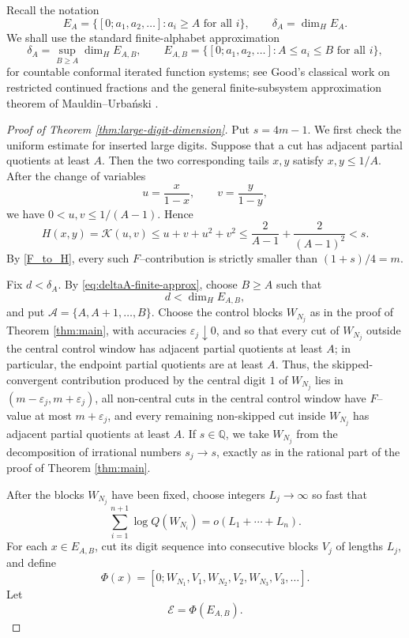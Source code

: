 \documentclass[11pt]{amsart}
\newcommand{\Q}{\mathbb Q}
\newcommand{\Kfun}{\mathcal K}
\begin{document}
Recall the notation
$$
        E_A=\{[0;a_1,a_2,\ldots]:a_i\ge A\text{ for all }i\},
        \qquad
        \delta_A=\dim_{H}E_A.
$$
We shall use the standard finite-alphabet approximation
\begin{equation}\label{eq:deltaA-finite-approx}
        \delta_A=\sup_{B\ge A}\dim_{H}E_{A,B},
        \qquad
        E_{A,B}=\{[0;a_1,a_2,\ldots]: A\le a_i\le B\text{ for all }i\},
\end{equation}
for countable conformal iterated function systems; see Good's classical work on restricted continued fractions \cite{Good1941} and the general finite-subsystem approximation theorem of Mauldin--Urba\'nski \cite{MauldinUrbanski1996}.


\begin{proof}[Proof of Theorem \ref{thm:large-digit-dimension}]
Put $s=4m-1$.  We first check the uniform estimate for inserted large digits.  Suppose that a cut has adjacent partial quotients at least $A$.  Then the two corresponding tails $x,y$ satisfy $x,y\le 1/A$.  After the change of variables
$$
        u=\frac{x}{1-x},
        \qquad
        v=\frac{y}{1-y},
$$
we have $0<u,v\le 1/(A-1)$.  Hence
$$
        H(x,y)=\Kfun(u,v)
        \le u+v+u^2+v^2
        \le \frac{2}{A-1}+\frac{2}{(A-1)^2}
        <s.
$$
By \eqref{F_to_H}, every such $F$--contribution is strictly smaller than $(1+s)/4=m$.

Fix $d<\delta_A$.  By \eqref{eq:deltaA-finite-approx}, choose $B\ge A$ such that
$$
        d<\dim_H E_{A,B},
$$
and put $\mathcal A=\{A,A+1,\ldots,B\}$.  Choose the control blocks $W_{N_j}$ as in the proof of Theorem \ref{thm:main}, with accuracies $\varepsilon_j\downarrow0$, and so that every cut of $W_{N_j}$ outside the central control window has adjacent partial quotients at least $A$; in particular, the endpoint partial quotients are at least $A$.  Thus, the skipped-convergent contribution produced by the central digit $1$ of $W_{N_j}$ lies in $(m-\varepsilon_j,m+\varepsilon_j)$, all non-central cuts in the central control window have $F$--value at most $m+\varepsilon_j$, and every remaining non-skipped cut inside $W_{N_j}$ has adjacent partial quotients at least $A$.  If $s\in\Q$, we take $W_{N_j}$ from the decomposition of irrational numbers $s_j\to s$, exactly as in the rational part of the proof of Theorem \ref{thm:main}.

After the blocks $W_{N_j}$ have been fixed, choose integers $L_j\to\infty$ so fast that
$$
        \sum_{i=1}^{n+1}\log Q(W_{N_i})=o(L_1+\cdots+L_n).
$$
For each $x\in E_{A,B}$, cut its digit sequence into consecutive blocks $V_j$ of lengths $L_j$, and define
$$
        \Phi(x)=[0;W_{N_1},V_1,W_{N_2},V_2,W_{N_3},V_3,\ldots].
$$
Let
$$
        \mathcal E=\Phi(E_{A,B}).
$$


\end{proof}
\end{document}
